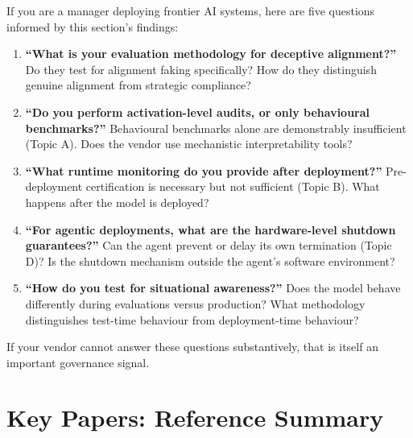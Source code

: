 \documentclass[11pt, a4paper]{article}
\begin{document}
If you are a manager deploying frontier AI systems, here are five questions informed by this section's findings:

\begin{enumerate}
  \item \textbf{``What is your evaluation methodology for deceptive alignment?''} Do they test for alignment faking specifically? How do they distinguish genuine alignment from strategic compliance?

  \item \textbf{``Do you perform activation-level audits, or only behavioural benchmarks?''} Behavioural benchmarks alone are demonstrably insufficient (Topic A). Does the vendor use mechanistic interpretability tools?

  \item \textbf{``What runtime monitoring do you provide after deployment?''} Pre-deployment certification is necessary but not sufficient (Topic B). What happens after the model is deployed?

  \item \textbf{``For agentic deployments, what are the hardware-level shutdown guarantees?''} Can the agent prevent or delay its own termination (Topic D)? Is the shutdown mechanism outside the agent's software environment?

  \item \textbf{``How do you test for situational awareness?''} Does the model behave differently during evaluations versus production? What methodology distinguishes test-time behaviour from deployment-time behaviour?
\end{enumerate}

If your vendor cannot answer these questions substantively, that is itself an important governance signal.


\section{Key Papers: Reference Summary}
\end{document}

